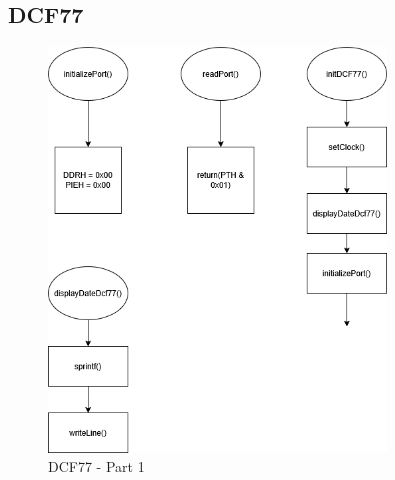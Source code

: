 \documentclass[a4paper,12pt]{article}
\begin{document}
\subsection{DCF77}

\begin{figure}[H]
    \centering
    \includegraphics[width=0.8\textwidth]{diagrams/5.dcf771.png}
    \caption{DCF77 - Part 1}
    \label{fig:DCF77}
\end{figure}
\end{document}
